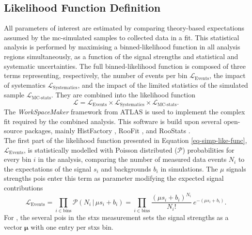 \subsection{Likelihood Function Definition}\label{subsec-likelidef}
All parameters of interest are estimated by comparing theory-based expectations assumed by the \gls{mc}-simulated samples to collected data in a fit. This statistical analysis is performed by maximising a binned-likelihood function in all analysis regions simultaneously, as a function of the signal strengths and statistical and systematic uncertainties. The full binned-likelihood function is composed of three terms representing, respectively, the number of events per bin $\mathcal{L}_{\text{Events}}$, the impact of systematics $\mathcal{L}_{\text{Systematics}}$, and the impact of the limited statistics of the simulated sample $\mathcal{L}_{\text{MC-stats}}$. They are combined into the likelihood function
\begin{equation}\label{eq-simp-like-func}
    \mathcal{L} = \mathcal{L}_{\text{Events}} \times \mathcal{L}_{\text{Systematics}} \times \mathcal{L}_{\text{MC-stats}}.
\end{equation}
The \textit{WorkSpaceMaker} framework from ATLAS is used to implement the complex fit required by the combined analysis. This software is build upon several open-source packages, mainly HistFactory \cite{Cranmer:2012sba}, RooFit \cite{verkerke2003roofittoolkitdatamodeling}, and RooStats \cite{Moneta:2010pm}. \\

The first part of the likelihood function presented in Equation \ref{eq-simp-like-func}, $\mathcal{L}_{\text{Events}}$, is statistically modelled with Poisson distributed ($\mathcal{P}$) probabilities for every bin $i$ in the analysis, comparing the number of measured data events $N_i$ to the expectations of the signal $s_i$ and backgrounds $b_i$ in simulations. The $\mu$ signals strengths \glspl{poi} enter this term as parameter modifying the expected signal contributions \[\mathcal{L}_{\text{Events}} = \prod_{i\in \textrm{bins}} \mathcal{P}(N_i \,|\, \mu s_i + b_i) = \prod_{i\in \textrm{bins}} \frac{\left(\mu s_i + b_i\right)^{N_i}}{N_i!} \, e^{-\left(\mu s_i + b_i\right)}.\] For \vhb, the several \glspl{poi} in the \gls{stxs} measurement sets the signal strengths as a vector $\boldsymbol{\mu}$ with one entry per \gls{stxs} bin. \\

